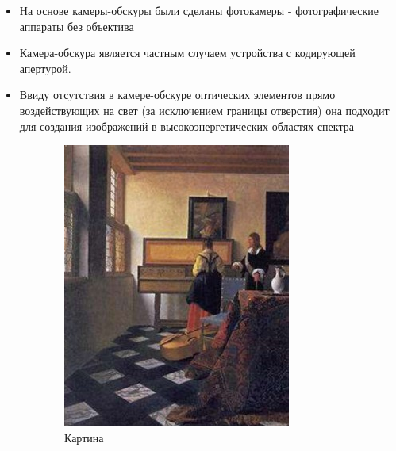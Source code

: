 \documentclass[a4paper, 14pt]{extarticle}
\begin{document}
\begin{itemize}
	\item На основе камеры-обскуры были сделаны фотокамеры - фотографические аппараты без объектива
	\item Камера-обскура является частным случаем устройства с кодирующей апертурой.
	\item Ввиду отсутствия в камере-обскуре оптических элементов прямо воздействующих на свет (за исключением границы отверстия) она подходит для создания изображений в высокоэнергетических областях спектра
\end{itemize}
\begin{figure}[h]
	\centering
	\begin{subfigure}[b]{0.45\textwidth}
		\centering
		\includegraphics[width=\textwidth]{l5/S009.jpg}
		\caption{Картина}
	\end{subfigure}
	\begin{subfigure}[b]{0.45\textwidth}
		\centering

\end{subfigure}
\end{figure}
\end{document}
